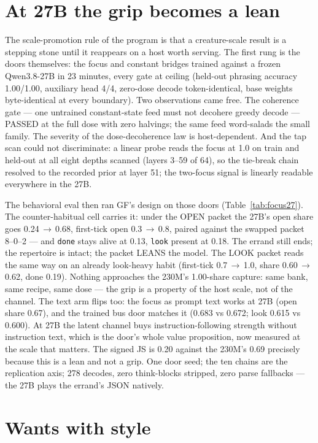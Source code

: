 \documentclass[11pt]{article}
\begin{document}
\section{At 27B the grip becomes a lean}

The scale-promotion rule of the program is that a creature-scale
result is a stepping stone until it reappears on a host worth serving.
The first rung is the doors themselves: the focus and constant bridges
trained against a frozen Qwen3.8-27B in 23 minutes,
every gate at ceiling (held-out phrasing accuracy 1.00/1.00, auxiliary
head 4/4, zero-dose decode token-identical, base weights byte-identical
at every boundary). Two observations came free. The coherence gate ---
one untrained constant-state feed must not decohere greedy decode ---
PASSED at the full dose with zero halvings; the same feed word-salads
the small family. The severity of the dose-decoherence law is
host-dependent. And the tap scan could not discriminate: a linear probe
reads the focus at 1.0 on train and held-out at all eight depths
scanned (layers 3--59 of 64), so the
tie-break chain resolved to the recorded prior at layer 51; the
two-focus signal is linearly readable everywhere in the 27B.

The behavioral eval then ran GF's design on those doors
(Table~\ref{tab:focus27}). The counter-habitual cell carries it:
under the OPEN packet the 27B's open share goes
0.24\,$\to$\,0.68,
first-tick open 0.3\,$\to$\,0.8,
paired against the swapped packet 8--0--2
--- and \texttt{done} stays alive at 0.13, \texttt{look}
present at 0.18. The errand
still ends; the repertoire is intact; the packet LEANS the model. The
LOOK packet reads the same way on an already look-heavy habit
(first-tick 0.7\,$\to$\,1.0,
share 0.60\,$\to$\,0.62,
done 0.19). Nothing approaches the 230M's 1.00-share
capture: same bank, same recipe, same dose --- the grip is a property
of the host scale, not of the channel. The text arm flips too: the
focus as prompt text works at 27B (open share
0.67), and the trained bus door matches
it (0.683 vs 0.672;
look 0.615 vs 0.600).
At 27B the latent channel buys instruction-following strength without
instruction text, which is the door's whole value proposition, now
measured at the scale that matters. The signed JS is 0.20
against the 230M's 0.69 precisely because this is a lean and
not a grip. One door seed; the ten chains are the replication axis;
278 decodes, zero think-blocks stripped, zero parse
fallbacks --- the 27B plays the errand's JSON natively.

\section{Wants with style}
\end{document}
